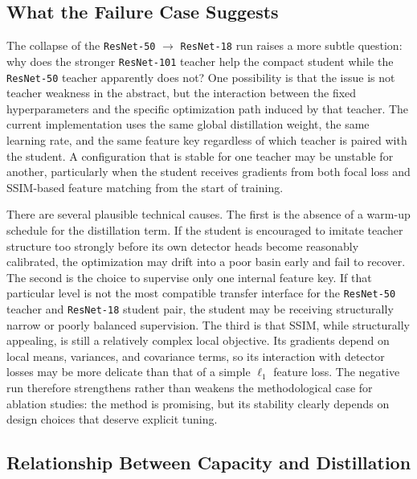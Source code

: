 \subsection{What the Failure Case Suggests}

The collapse of the \texttt{ResNet-50} $\rightarrow$ \texttt{ResNet-18} run raises a more subtle question: why does the stronger \texttt{ResNet-101} teacher help the compact student while the \texttt{ResNet-50} teacher apparently does not? One possibility is that the issue is not teacher weakness in the abstract, but the interaction between the fixed hyperparameters and the specific optimization path induced by that teacher. The current implementation uses the same global distillation weight, the same learning rate, and the same feature key regardless of which teacher is paired with the student. A configuration that is stable for one teacher may be unstable for another, particularly when the student receives gradients from both focal loss and SSIM-based feature matching from the start of training.

There are several plausible technical causes. The first is the absence of a warm-up schedule for the distillation term. If the student is encouraged to imitate teacher structure too strongly before its own detector heads become reasonably calibrated, the optimization may drift into a poor basin early and fail to recover. The second is the choice to supervise only one internal feature key. If that particular level is not the most compatible transfer interface for the \texttt{ResNet-50} teacher and \texttt{ResNet-18} student pair, the student may be receiving structurally narrow or poorly balanced supervision. The third is that SSIM, while structurally appealing, is still a relatively complex local objective. Its gradients depend on local means, variances, and covariance terms, so its interaction with detector losses may be more delicate than that of a simple $\ell_1$ feature loss. The negative run therefore strengthens rather than weakens the methodological case for ablation studies: the method is promising, but its stability clearly depends on design choices that deserve explicit tuning.

\subsection{Relationship Between Capacity and Distillation}

